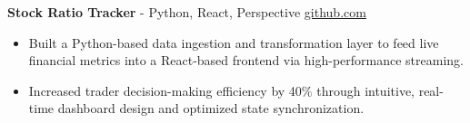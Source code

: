 \documentclass[11pt]{article}       %
\begin{document}
\textbf{Stock Ratio Tracker}{ - Python, React, Perspective} \hfill \href{https://github.com/Monica20030707/tradingDashboard-UI}{github.com} \\
\vspace{-9pt}
\begin{itemize}
  \item Built a Python-based data ingestion and transformation layer to feed live financial metrics into a React-based frontend via high-performance streaming.
  \item Increased trader decision-making efficiency by 40\% through intuitive, real-time dashboard design and optimized state synchronization.
\end{itemize}

\end{document}
